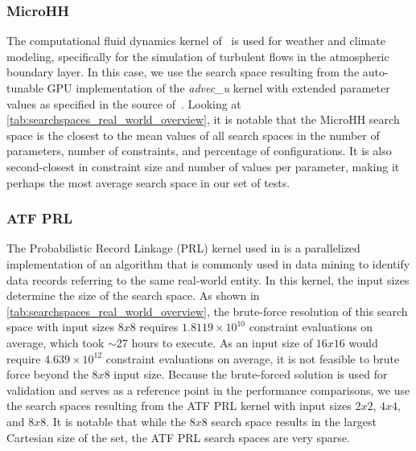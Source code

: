 \subsubsection{MicroHH} \label{subsubsec:evaluation_setup_kernel_microhh}
The computational fluid dynamics kernel of~\cite{MicroHH2017} is used for weather and climate modeling, specifically for the simulation of turbulent flows in the atmospheric boundary layer. 
In this case, we use the search space resulting from the auto-tunable GPU implementation of the \textit{advec\_u} kernel with extended parameter values as specified in the source of~\cite{heldensKernelLauncherLibrary2023}. %
Looking at \cref{tab:searchspaces_real_world_overview}, it is notable that the MicroHH search space is the closest to the mean values of all search spaces in the number of parameters, number of constraints, and percentage of configurations. It is also second-closest in constraint size and number of values per parameter, making it perhaps the most average search space in our set of tests.

\subsubsection{ATF PRL} \label{subsubsec:evaluation_setup_kernel_atf_prl}
The Probabilistic Record Linkage (PRL) kernel used in \cite{searchspaceATF} is a parallelized implementation of an algorithm that is commonly used in data mining to identify data records referring to the same real-world entity. 
In this kernel, the input sizes determine the size of the search space. As shown in \cref{tab:searchspaces_real_world_overview}, the brute-force resolution of this search space with input sizes $8x8$ requires $1.8119 \times 10^{10}$ constraint evaluations on average, which took $\sim$27 hours to execute. %
As an input size of $16x16$ would require $4.639 \times 10^{12}$ constraint evaluations on average, it is not feasible to brute force beyond the $8x8$ input size. %
Because the brute-forced solution is used for validation and serves as a reference point in the performance comparisons, we use the search spaces resulting from the ATF PRL kernel with input sizes $2x2$, $4x4$, and $8x8$. It is notable that while the $8x8$ search space results in the largest Cartesian size of the set, the ATF PRL search spaces are very sparse. 

